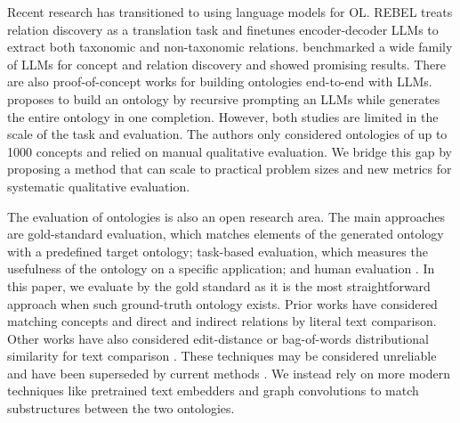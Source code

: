 \documentclass{article}
\begin{document}
Recent research has transitioned to using language models for OL. REBEL \cite{cabot2021rebel} treats relation discovery as a translation task and finetunes encoder-decoder LLMs to extract both taxonomic and non-taxonomic relations. \citet{babaei2023llms4ol} benchmarked a wide family of LLMs for concept and relation discovery and showed promising results. There are also proof-of-concept works for building ontologies end-to-end with LLMs. \citet{funk2023towards} proposes to build an ontology by recursive prompting an LLMs while \citet{trajanoska2023enhancing} generates the entire ontology in one completion. However, both studies are limited in the scale of the task and evaluation. The authors only considered ontologies of up to 1000 concepts and relied on manual qualitative evaluation. We bridge this gap by proposing a method that can scale to practical problem sizes and new metrics for systematic qualitative evaluation.

The evaluation of ontologies is also an open research area. The main approaches are gold-standard evaluation, which matches elements of the generated ontology with a predefined target ontology; task-based evaluation, which measures the usefulness of the ontology on a specific application; and human evaluation \cite{raad2015survey,brank2005survey}. In this paper, we evaluate by the gold standard as it is the most straightforward approach when such ground-truth ontology exists. Prior works have considered matching concepts \cite{maedche2002measuring} and direct and indirect relations \cite{Kashyap2005TaxaMinerAE, Treeratpituk2013GraphbasedAT} by literal text comparison. Other works have also considered edit-distance \cite{Ehrig2005SimilarityFO} or bag-of-words distributional similarity for text comparison \cite{Zavitsanos2011GoldSE}.  These techniques may be considered unreliable and have been superseded by current methods \cite{conneau2017supervised}. We instead rely on more modern techniques like pretrained text embedders \cite{devlin2018bert} and graph convolutions \cite{kipf2016semi} to match substructures between the two ontologies.
\end{document}
